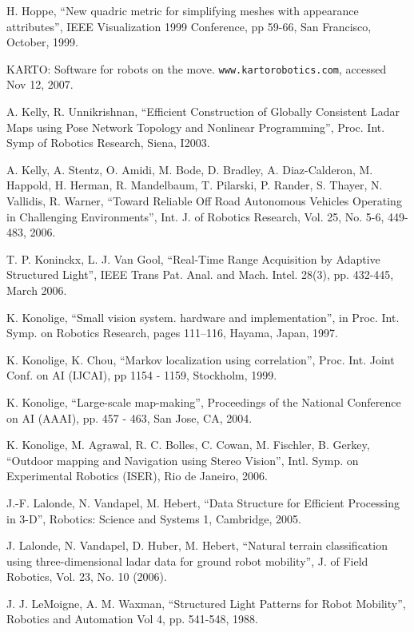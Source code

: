 \documentclass[twocolumn,oneside]{book}
\begin{document}
\begin{thebibliography}{99}
H. Hoppe,	
``New quadric metric for simplifying meshes with appearance attributes'',
IEEE Visualization 1999 Conference, pp 59-66, San Francisco, October, 1999.

KARTO: Software for robots on the move.
\verb+www.kartorobotics.com+, accessed Nov 12, 2007.


A. Kelly, R. Unnikrishnan,
``Efficient Construction of Globally Consistent Ladar Maps using Pose Network Topology
and Nonlinear Programming'',
Proc. Int. Symp of Robotics Research, Siena, I2003.

A. Kelly, A. Stentz, O. Amidi, M. Bode, D. Bradley, A. Diaz-Calderon, M. Happold, H. Herman, R. Mandelbaum,
T. Pilarski, P. Rander, S. Thayer, N. Vallidis, R. Warner,
``Toward Reliable Off Road Autonomous Vehicles Operating in Challenging Environments'',
Int. J. of Robotics Research, Vol. 25, No. 5-6, 449-483, 2006.

T. P. Koninckx, L. J. Van Gool,
``Real-Time Range Acquisition by Adaptive Structured Light'',
IEEE Trans Pat. Anal. and Mach. Intel. 28(3), pp. 432-445, March 2006. 

K. Konolige,
``Small vision system. hardware and implementation'',
in Proc. Int. Symp. on Robotics Research, pages 111--116,
Hayama, Japan, 1997.

K. Konolige, K. Chou,
``Markov localization using correlation'',
Proc. Int. Joint Conf. on AI (IJCAI), pp 1154 - 1159, Stockholm, 1999.

K. Konolige,
``Large-scale map-making'',
Proceedings of the National Conference on AI (AAAI), pp. 457 - 463, San Jose, CA, 2004.

K. Konolige, M. Agrawal, R. C. Bolles, C. Cowan, M. Fischler, B. Gerkey,
``Outdoor mapping and Navigation using Stereo Vision'',
Intl. Symp. on Experimental Robotics (ISER), Rio de Janeiro, 2006.

J.-F. Lalonde, N. Vandapel, M. Hebert,
``Data Structure for Efficient Processing in 3-D'',
Robotics: Science and Systems 1, Cambridge, 2005.

J. Lalonde, N. Vandapel, D. Huber, M. Hebert,
``Natural terrain classification using three-dimensional ladar data
for ground robot mobility'',
J. of Field Robotics, Vol. 23, No. 10 (2006).

J. J. LeMoigne, A. M. Waxman, 
``Structured Light Patterns for Robot Mobility'',
Robotics and Automation Vol 4, pp. 541-548, 1988.


\end{thebibliography}
\end{document}
